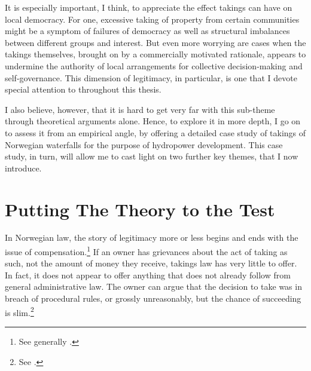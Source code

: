 {It is especially important, I think, to appreciate the effect takings can have on local democracy. For one, excessive taking of property from certain communities might be a symptom of failures of democracy as well as structural imbalances between different groups and interest. But even more worrying are cases when the takings themselves, brought on by a commercially motivated rationale, appears to undermine the authority of local arrangements for collective decision-making and self-governance. This dimension of legitimacy, in particular, is one that I devote special attention to throughout this thesis.

I also believe, however, that it is hard to get very far with this sub-theme through theoretical arguments alone. Hence, to explore it in more depth, I go on to assess it from an empirical angle, by offering a detailed case study of takings of Norwegian waterfalls for the purpose of hydropower development. This case study, in turn, will allow me to cast light on two further key themes, that I now introduce. %
}

\section{Putting The Theory to the Test}\label{sec:1:3}

In Norwegian law, the story of legitimacy more or less begins and ends with the issue of compensation.\footnote{See generally \cite{dyrkolbotn15a}.} If an owner has grievances about the act of taking as such, not the amount of money they receive, takings law has very little to offer. In fact, it does not appear to offer anything that does not already follow from general administrative law. The owner can argue that the decision to take was in breach of procedural rules, or grossly unreasonably, but the chance of succeeding is slim.\footnote{See \cite[384-386]{dyrkolbotn15b}.}


